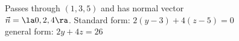 {Passes through $(1,3,5)$ and has normal vector\\ $\vec n= \la 0,2,4\ra$.
}
{Standard form: $2(y-3)+4(z-5)=0$\\
general form: $2y+4z=26$
}

